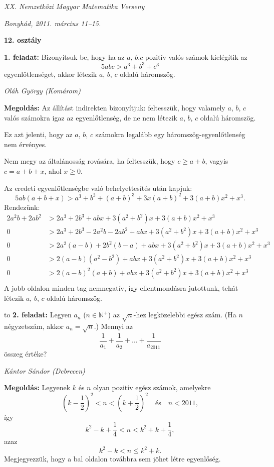 \documentclass[a4paper,10pt]{article}
\newcommand{\ki}[2]{\hfill {\it #1 (#2)}\medskip}
\newcommand{\vonal}{\hbox to \hsize{\hskip2truecm\hrulefill\hskip2truecm}}
\begin{document}
\begin{center} \Large {\em XX. Nemzetközi Magyar Matematika Verseny} \end{center}
\begin{center} \large{\em Bonyhád, 2011. március 11--15.} \end{center}
\smallskip
\begin{center} \large{\bf 12. osztály} \end{center}
\bigskip 

{\bf 1. feladat: } 
Bizonyítsuk be, hogy ha az $a$, $b$,$c$ pozitív valós számok kielégítik az
\[5abc>a^3+b^3+c^3\]
egyenlőtlenséget, akkor létezik $a$, $b$, $c$ oldalú háromszög.

\ki{Oláh György}{Komárom}\medskip

{\bf Megoldás: } Az állítást indirekten bizonyítjuk: feltesszük, hogy valamely $a$, $b$, $c$ valós számokra igaz az egyenlőtlenség, de ne nem létezik $a$, $b$, $c$ oldalú háromszög.

Ez azt jelenti, hogy az $a$, $b$, $c$ számokra legalább egy háromszög-egyenlőtlenség nem
érvényes.

Nem megy az általánosság rovására, ha feltesszük, hogy $c\ge a+b$, vagyis $c=a+b+x$, ahol
$x\ge0$.

Az eredeti egyenlőtlenségbe való behelyettesítés után kapjuk:
\[5ab(a+b+x)>a^3+b^3+(a+b)^3+3x(a+b)^2+3(a+b)x^2+x^3.\]
Rendezünk:
\begin{align*}
2a^2b+2ab^2&>2a^3+2b^3+abx+3\left(a^2+b^2\right)x+3(a+b)x^2+x^3\\
0&>2a^3+2b^3-2a^2b-2ab^2+abx+3\left(a^2+b^2\right)x+3(a+b)x^2+x^3\\
0&>2a^2(a-b)+2b^2(b-a)+abx+3\left(a^2+b^2\right)x+3(a+b)x^2+x^3\\
0&>2(a-b)\left(a^2-b^2\right)+abx+3\left(a^2+b^2\right)x+3(a+b)x^2+x^3\\
0&>2(a-b)^2(a+b)+abx+3\left(a^2+b^2\right)x+3(a+b)x^2+x^3\\
\end{align*}
A jobb oldalon minden tag nemnegatív, így ellentmondásra jutottunk, tehát létezik $a$, $b$, $c$ oldalú háromszög.

\medskip
\vonal
{\bf 2. feladat: } 
Legyen $a_n$ ($n\in\mathbb{N}^+$) az $\sqrt{n}$-hez legközelebbi egész szám. (Ha $n$ négyzetszám, akkor $a_n=\sqrt{n}$.) Mennyi az
\[\frac{1}{a_1}+\frac{1}{a_2}+\ldots+\frac{1}{a_{2011}}\]
összeg értéke?

\ki{Kántor Sándor}{Debrecen}\medskip

{\bf Megoldás: } Legyenek $k$ és $n$ olyan pozitív egész számok, amelyekre
\[\left(k-\frac12\right)^2<n<\left(k+\frac12\right)^2\quad\textrm{és}\quad n<2011,\]
így
\[k^2-k+\frac14<n<k^2+k+\frac14,\]
azaz
\[k^2-k<n\le k^2+k.\]
Megjegyezzük, hogy a bal oldalon továbbra sem jöhet létre egyenlőség.
\end{document}
